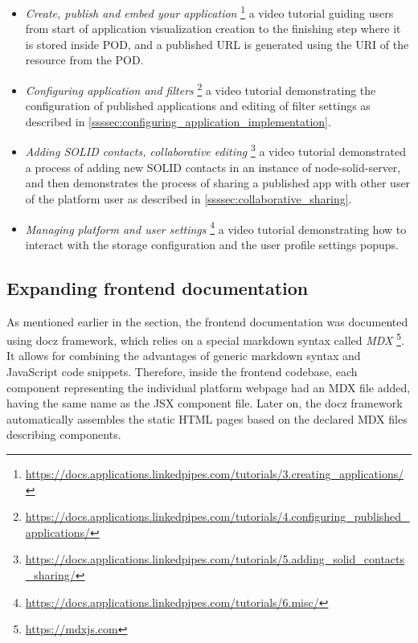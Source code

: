 \begin{itemize}
    \item \textit{Create, publish and embed your application} \footnote{\url{https://docs.applications.linkedpipes.com/tutorials/3.creating_applications/}} a video tutorial guiding users from start of application visualization creation to the finishing step where it is stored inside \solid{} POD, and a published URL is generated using the URI of the resource from the POD.
    \item \textit{Configuring application and filters} \footnote{\url{https://docs.applications.linkedpipes.com/tutorials/4.configuring_published_applications/}} a video tutorial demonstrating the configuration of published applications and editing of filter settings as described in \autoref{ssssec:configuring_application_implementation}.
    \item \textit{Adding SOLID contacts, collaborative editing} \footnote{\url{https://docs.applications.linkedpipes.com/tutorials/5.adding_solid_contacts_sharing/}} a video tutorial demonstrated a process of adding new SOLID contacts in an instance of node-solid-server, and then demonstrates the process of sharing a published app with other user of the platform user as described in \autoref{ssssec:collaborative_sharing}.
    \item \textit{Managing platform and user settings} \footnote{\url{https://docs.applications.linkedpipes.com/tutorials/6.misc/}} a video tutorial demonstrating how to interact with the storage configuration and the \solid{} user profile settings popups. 
\end{itemize} 

\subsection{Expanding frontend documentation}

As mentioned earlier in the section, the frontend documentation was documented using docz framework, which relies on a special markdown syntax called \textit{MDX} \footnote{\url{https://mdxjs.com}}. It allows for combining the advantages of generic markdown syntax and JavaScript code snippets. Therefore, inside the frontend codebase, each component representing the individual platform webpage had an MDX file added, having the same name as the JSX component file. Later on, the docz framework automatically assembles the static HTML pages based on the declared MDX files describing components. 


